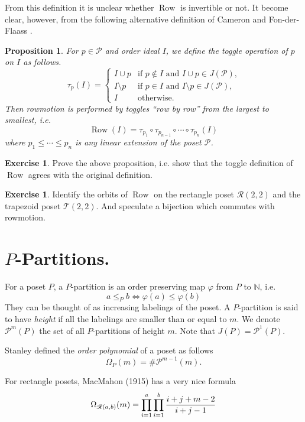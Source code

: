 \documentclass[12pt]{amsart}
\newcommand{\rrr}[0]{\mathscr{R}}
\newcommand{\ttt}[0]{\mathscr{T}}
\theoremstyle{plain}
\newtheorem{prop}[theorem]{Proposition}
\theoremstyle{definition}
\newtheorem{exercise}[theorem]{Exercise}
\DeclareMathOperator{\row}{Row}
\newcommand{\calP}[0]{\mathcal{P}}
\newcommand{\cal}[1]{\mathcal{#1}}
\begin{document}
From this definition it is unclear whether $\row$ is invertible or not.
It become clear, however, from the following alternative definition of
Cameron and Fon-der-Flaass \cite{toggles}.

\begin{prop}\label{prop:row_as_toggles}
	For $p\in\mathcal P$ and order ideal $I$, we define the toggle operation of $p$ on $I$ as follows.
\[\tau_p(I)=\begin{cases}
I\cup p&\text{if }p\notin I\text{ and } I\cup p\in J(\mathcal P)\text{,}\\
I\setminus p&\text{if }p\in I\text{ and }I\setminus p\in J(\mathcal P)\text{,}\\
I&\text{otherwise.}
\end{cases}\]
Then rowmotion is performed by toggles ``row by row'' %
from the largest to smallest, i.e.
$$\row(I) =\tau_{p_1}\circ\tau_{p_{n-1}} \circ\cdots\circ\tau_{p_n}(I)$$
where $p_1\le\cdots\le p_n$ is any linear extension of the poset $\mathcal P$.
\end{prop}
\begin{exercise}
	Prove the above proposition, i.e. show that the toggle definition of $\row$ agrees with the original definition.
\end{exercise}
\begin{exercise}
	Identify the orbits of $\row$ on the rectangle poset $\rrr(2,2)$ and the trapezoid poset $\ttt(2,2)$. And speculate a bijection which commutes with rowmotion.
\end{exercise}
\section{$P$-Partitions.} 



For a poset $P$, a $P$-partition is an order preserving map $\varphi$ from $P$ to $\mathbb{N}$, i.e. 
\[a\leq_P b \iff \varphi(a)\leq \varphi(b) \]
They can be thought of as increasing labelings of the poset. A $P$-partition is said to have \emph{height} if all the labelings are smaller than or equal to $m$. We denote $\cal P^m(P)$ the set of all $P$-partitions of height $m$. Note that $J(P)=\cal P^1(P)$.

Stanley defined the \emph{order polynomial} of a poset as follows
\[\Omega_P(m)=\# \calP^{m-1}(m).\]

For rectangle posets, MacMahon (1915) has a very nice formula
\[\Omega_{\rrr(a,b)}(m)=\prod_{i=1}^a\prod_{i=1}^b{i+j+m-2\over i+j-1}\]
\end{document}
